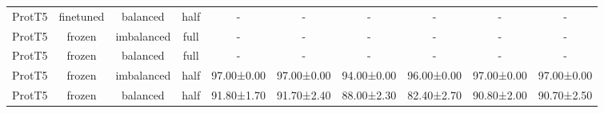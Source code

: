 \begin{tabular}{lccccccccc}
      ProtT5 &      finetuned &   balanced &      half &           - &           - &           - &           - &           - &           - \\
      ProtT5 &         frozen & imbalanced &      full &           - &           - &           - &           - &           - &           - \\
      ProtT5 &         frozen &   balanced &      full &           - &           - &           - &           - &           - &           - \\
      ProtT5 &         frozen & imbalanced &      half &  97.00±0.00 &  97.00±0.00 &  94.00±0.00 &  96.00±0.00 &  97.00±0.00 &  97.00±0.00 \\
      ProtT5 &         frozen &   balanced &      half &  91.80±1.70 &  91.70±2.40 &  88.00±2.30 &  82.40±2.70 &  90.80±2.00 &  90.70±2.50 \\
\bottomrule
\end{tabular}
